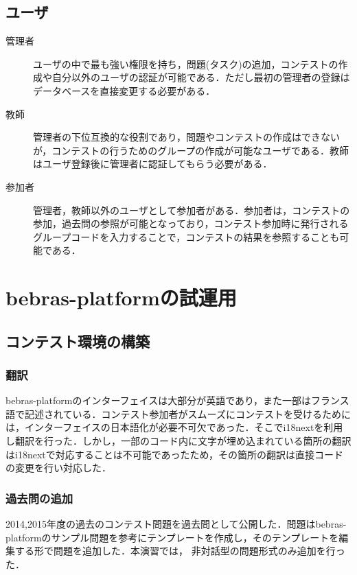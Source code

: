 \documentclass[a4paper]{jarticle}
\begin{document}
\begin{multicols}{2}
\subsection{ユーザ}
\begin{description}
\item[管理者]  ユーザの中で最も強い権限を持ち，問題(タスク)の追加，コンテストの作成や自分以外のユーザの認証が可能である．ただし最初の管理者の登録はデータベースを直接変更する必要がある． 
\end{description}

\begin{description}
\item[教師] 管理者の下位互換的な役割であり，問題やコンテストの作成はできないが，コンテストの行うためのグループの作成が可能なユーザである．教師はユーザ登録後に管理者に認証してもらう必要がある．
\end{description}

\begin{description}
\item[参加者] 管理者，教師以外のユーザとして参加者がある．参加者は，コンテストの参加，過去問の参照が可能となっており，コンテスト参加時に発行されるグループコードを入力することで，コンテストの結果を参照することも可能である．
\end{description}




\section{bebras-platformの試運用}
\subsection{コンテスト環境の構築}
\subsubsection{翻訳}
bebras-platformのインターフェイスは大部分が英語であり，また一部はフランス語で記述されている．コンテスト参加者がスムーズにコンテストを受けるためには，インターフェイスの日本語化が必要不可欠であった．そこでi18nextを利用し翻訳を行った．しかし，一部のコード内に文字が埋め込まれている箇所の翻訳はi18nextで対応することは不可能であったため，その箇所の翻訳は直接コードの変更を行い対応した．
\subsubsection{過去問の追加}
2014,2015年度の過去のコンテスト問題を過去問として公開した．問題はbebras-platformのサンプル問題を参考にテンプレートを作成し，そのテンプレートを編集する形で問題を追加した．本演習では，
非対話型の問題形式のみ追加を行った．


\end{multicols}
\end{document}
